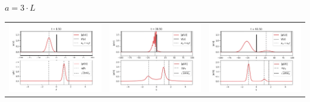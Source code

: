 \documentclass[11pt]{article}
\begin{document}
$a = 3\cdot L$ \\
\begin{tabular}{ccc}
	\includegraphics[scale=0.2]{sh_3_8_50} & 
	\includegraphics[scale=0.2]{sh_3_38_50} & 
	\includegraphics[scale=0.2]{sh_3_93_50} \\
\end{tabular}
\end{document}

